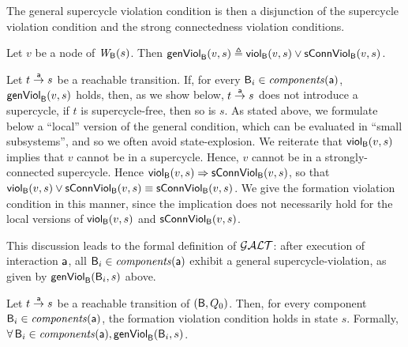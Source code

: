 The general supercycle violation condition is then a disjunction of the supercycle violation condition
and the strong connectedness violation conditions.


\begin{definition}
\label{def:formation.violation} 
\label{defn:formation.violation} 
Let $v$ be a node of $\wfg{\B}{s}$.
Then 
$\genViol{v}{s}  \df \scV{v}{s}  \lor \connViol{v}{s}$.
\end{definition}
%
Let $t \goesto[\act] s$ be a reachable transition. If, for every $\B_i \in \cmps{\act}$, $\formViol{v}{s}$ holds, then, as we show below,
$t \goesto[\act] s$ does not introduce a supercycle, \ie if $t$ is supercycle-free, then so is $s$. As stated above, we formulate below a ``local''
version of the general condition, which can be evaluated in ``small subsystems'', and so we often avoid state-explosion.
We reiterate that $\scV{v}{s}$ implies that $v$ cannot be in a supercycle. Hence, $v$ cannot be in a strongly-connected supercycle.
Hence $\scV{v}{s} \imp \connViol{v}{s}$, so that 
$\scV{v}{s}  \lor \connViol{v}{s} \ev  \connViol{v}{s}$.
We give the formation violation condition in this manner, since 
the implication does not necessarily hold for the local versions of $\scV{v}{s}$ and $\connViol{v}{s}$.

This discussion leads to the formal definition of $\GAO$: 
after execution of interaction $\act$, all $\B_i \in \cmps{\act}$ exhibit a general supercycle-violation, as given by $\genViol{\B_i}{s}$ above.

\begin{definition} \label{def:global.ANDOR-cond} \label{defn:global.ANDOR-cond} 
Let $t \goesto[\act] s$ be a reachable transition of $(\B, Q_0)$.
Then, for every component $\B_i \in \comps{\act}$, the formation violation condition holds in state $s$.
Formally,\\
\ind  $\fas \B_i \in \comps{\act}, \genViol{\B_i}{s}$.
\end{definition}


